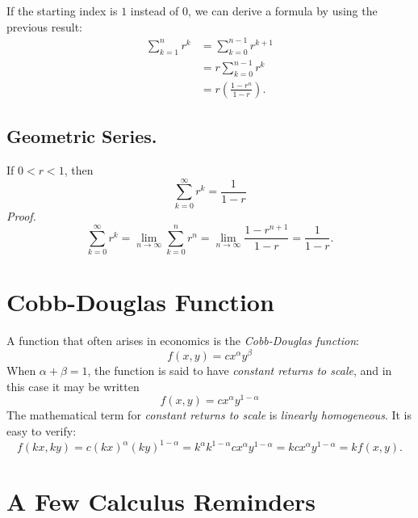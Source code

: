 \documentclass[reqno]{immbook}
\numberwithin{equation}{chapter}
\newtheorem{question}{Question}
\numberwithin{question}{section}
\numberwithin{theorem}{chapter}
\numberwithin{figure}{chapter}
\theoremstyle{definition}
\begin{document}
\medskip
\noindent
If the starting index is $1$ instead of $0$,
we can derive a formula by using the previous
result:
\begin{equation}
\begin{split}
  \sum_{k=1}^{n} r^k & = \sum_{k=0}^{n-1}r^{k+1} \\
      & = r \sum_{k=0}^{n-1} r^{k} \\
      & = r\left(\frac{1-r^n}{1-r}\right).
\end{split}
\label{eqn:geomsumfromone}
\end{equation}

\subsection*{Geometric Series.}
If $0 < r < 1$, then
\begin{equation}
   \sum_{k=0}^{\infty} r^k = \frac{1}{1-r}
\end{equation}
\noindent
\emph{Proof.}
\[
  \sum_{k=0}^{\infty} r^k
    = \lim_{n\rightarrow\infty} \sum_{k=0}^{n} r^n
    = \lim_{n\rightarrow\infty} \frac{1-r^{n+1}}{1-r}
    = \frac{1}{1-r}.
\]
%
\section{Cobb-Douglas Function}
%
\label{sec:cobbdouglas}
A function that often arises in economics
is the \emph{Cobb-Douglas function}:
\begin{equation}
  f(x,y) = cx^{\alpha}y^{\beta}
\end{equation}
When $\alpha+\beta=1$, the function is said to have
\emph{constant returns to scale},
and in this case it may
be written
\begin{equation}
  f(x,y) = cx^{\alpha}y^{1-\alpha}
\end{equation}
The mathematical term for \emph{constant returns to scale}
is \emph{linearly homogeneous}.
It is easy to verify:
\begin{equation}
  f(kx,ky) = c(kx)^{\alpha}(ky)^{1-\alpha}
     = k^{\alpha}k^{1-\alpha} c x^{\alpha}y^{1-\alpha}
     = k c x^{\alpha}y^{1-\alpha}
     = k f(x,y).
\end{equation}
%
\section{A Few Calculus Reminders}
\end{document}
